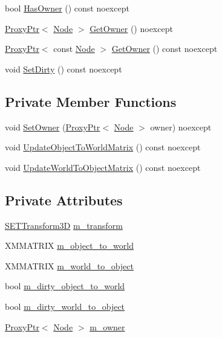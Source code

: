 \begin{DoxyCompactItemize}
\item 
bool \mbox{\hyperlink{classmage_1_1_transform_ac24796b2d6179c1488410d36afdf6b68}{Has\+Owner}} () const noexcept
\item 
\mbox{\hyperlink{classmage_1_1_proxy_ptr}{Proxy\+Ptr}}$<$ \mbox{\hyperlink{classmage_1_1_node}{Node}} $>$ \mbox{\hyperlink{classmage_1_1_transform_afc6a2f11abb7d13de831f2c78470dc04}{Get\+Owner}} () noexcept
\item 
\mbox{\hyperlink{classmage_1_1_proxy_ptr}{Proxy\+Ptr}}$<$ const \mbox{\hyperlink{classmage_1_1_node}{Node}} $>$ \mbox{\hyperlink{classmage_1_1_transform_a90132f710e641238f3a988ffdbcc1a8b}{Get\+Owner}} () const noexcept
\item 
void \mbox{\hyperlink{classmage_1_1_transform_a8d760d79f5ad68377706234b8575e429}{Set\+Dirty}} () const noexcept
\end{DoxyCompactItemize}
\subsection*{Private Member Functions}
\begin{DoxyCompactItemize}
\item 
void \mbox{\hyperlink{classmage_1_1_transform_a6bc2db67891b193375d5b79cab4c223a}{Set\+Owner}} (\mbox{\hyperlink{classmage_1_1_proxy_ptr}{Proxy\+Ptr}}$<$ \mbox{\hyperlink{classmage_1_1_node}{Node}} $>$ owner) noexcept
\item 
void \mbox{\hyperlink{classmage_1_1_transform_a237fb0afa443909983e83f2e3863f4dd}{Update\+Object\+To\+World\+Matrix}} () const noexcept
\item 
void \mbox{\hyperlink{classmage_1_1_transform_a0cdac8ab1ae9570e6829fd88365df031}{Update\+World\+To\+Object\+Matrix}} () const noexcept
\end{DoxyCompactItemize}
\subsection*{Private Attributes}
\begin{DoxyCompactItemize}
\item 
\mbox{\hyperlink{classmage_1_1_s_e_t_transform3_d}{S\+E\+T\+Transform3D}} \mbox{\hyperlink{classmage_1_1_transform_af3a7c19eb29df506d1d4e47cab881fe4}{m\+\_\+transform}}
\item 
X\+M\+M\+A\+T\+R\+IX \mbox{\hyperlink{classmage_1_1_transform_a4e227321c984ddf2ece92d7954ae5db9}{m\+\_\+object\+\_\+to\+\_\+world}}
\item 
X\+M\+M\+A\+T\+R\+IX \mbox{\hyperlink{classmage_1_1_transform_a873fefd93a3c1ca938e2bbecdbc5b3ac}{m\+\_\+world\+\_\+to\+\_\+object}}
\item 
bool \mbox{\hyperlink{classmage_1_1_transform_a37b39fe67eaf4dc64d4b2c87b8868c4e}{m\+\_\+dirty\+\_\+object\+\_\+to\+\_\+world}}
\item 
bool \mbox{\hyperlink{classmage_1_1_transform_af0778d1dbe677b7af16add3c14a6259e}{m\+\_\+dirty\+\_\+world\+\_\+to\+\_\+object}}
\item 
\mbox{\hyperlink{classmage_1_1_proxy_ptr}{Proxy\+Ptr}}$<$ \mbox{\hyperlink{classmage_1_1_node}{Node}} $>$ \mbox{\hyperlink{classmage_1_1_transform_a3cf772460725cbb2d939f1f558e1d60c}{m\+\_\+owner}}
\end{DoxyCompactItemize}
